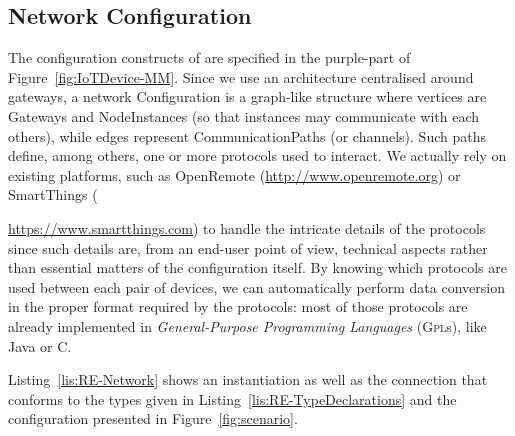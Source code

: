 \subsection{Network Configuration}
\label{sec:IoTDSL-NetworkConfiguration}

The configuration constructs of \IOTDSL are specified in the purple-part of Figure~\ref{fig:IoTDevice-MM}. Since we use an architecture centralised around gateways, a network \textsf{Configuration} is a graph-like structure where vertices are \textsf{Gateway}s and \textsf{NodeInstance}s (so that instances may communicate with each others), while edges represent \textsf{CommunicationPath}s (or channels). Such paths define, among others, one or more protocols used to interact. We actually rely on existing platforms, such as OpenRemote (\url{http://www.openremote.org}) or SmartThings ({\url{https://www.smartthings.com}) to handle the intricate details of the protocols since such details are, from an end-user point of view, technical aspects rather than essential matters of the configuration itself. By knowing which protocols are used between each pair of devices, we can automatically perform data conversion in the proper format required by the protocols: most of those protocols are already implemented in \textit{General-Purpose Programming Languages} (\textsc{Gpl}s), like Java or C.

Listing~\ref{lis:RE-Network} shows an instantiation as well as the connection that conforms to the types given in Listing~\ref{lis:RE-TypeDeclarations} and the configuration presented in Figure~\ref{fig:scenario}.
	
}
